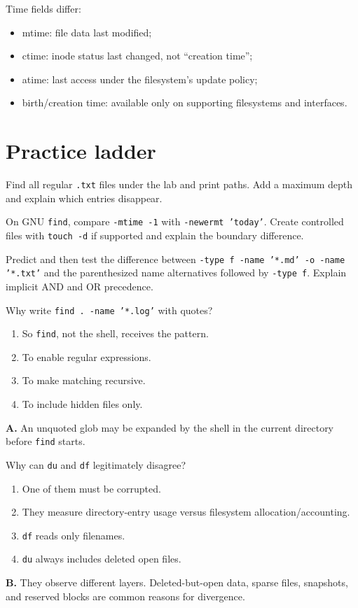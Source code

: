 \documentclass[11pt,oneside,openany]{book}
\newcommand{\fourchoices}[4]{%
  \begin{enumerate}[label=\Alph*),leftmargin=2em,itemsep=0.25em]
    \item #1
    \item #2
    \item #3
    \item #4
  \end{enumerate}}
\begin{document}
Time fields differ:
\begin{itemize}
  \item mtime: file data last modified;
  \item ctime: inode status last changed, not “creation time”;
  \item atime: last access under the filesystem's update policy;
  \item birth/creation time: available only on supporting filesystems and interfaces.
\end{itemize}

\section{Practice ladder}
\begin{practicebox}[title={Easy -- tree query}]
Find all regular \texttt{.txt} files under the lab and print paths. Add a maximum depth and explain which entries disappear.
\end{practicebox}
\begin{practicebox}[title={Medium -- modified today}]
On GNU \texttt{find}, compare \texttt{-mtime -1} with \texttt{-newermt 'today'}. Create controlled files with \texttt{touch -d} if supported and explain the boundary difference.
\end{practicebox}
\begin{practicebox}[title={Hard -- expression precedence}]
Predict and then test the difference between \texttt{-type f -name '*.md' -o -name '*.txt'} and the parenthesized name alternatives followed by \texttt{-type f}. Explain implicit AND and OR precedence.
\end{practicebox}

\begin{questionbox}[title={Medium 8.1 -- Pattern quotation}]
Why write \texttt{find . -name '*.log'} with quotes?
\fourchoices{So \texttt{find}, not the shell, receives the pattern.}{To enable regular expressions.}{To make matching recursive.}{To include hidden files only.}
\end{questionbox}
\begin{answerbox}
\textbf{A.} An unquoted glob may be expanded by the shell in the current directory before \texttt{find} starts.
\end{answerbox}

\begin{questionbox}[title={Hard 8.2 -- Disk reports}]
Why can \texttt{du} and \texttt{df} legitimately disagree?
\fourchoices{One of them must be corrupted.}{They measure directory-entry usage versus filesystem allocation/accounting.}{\texttt{df} reads only filenames.}{\texttt{du} always includes deleted open files.}
\end{questionbox}
\begin{answerbox}
\textbf{B.} They observe different layers. Deleted-but-open data, sparse files, snapshots, and reserved blocks are common reasons for divergence.
\end{answerbox}
\end{document}
